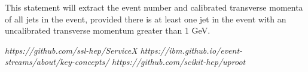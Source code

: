 \documentclass{webofc}
\begin{document}
\bigskip

This statement will extract the event number and calibrated transverse momenta of all jets in the
event, provided there is at least one jet in the event with an uncalibrated transverse momentum
greater than 1 GeV.

%
% 
%
%
\begin{thebibliography}{}
%
%
\textit{https://github.com/ssl-hep/ServiceX}
\textit{https://ibm.github.io/event-streams/about/key-concepts/}
\textit{https://github.com/scikit-hep/uproot}
\end{thebibliography}
\end{document}
